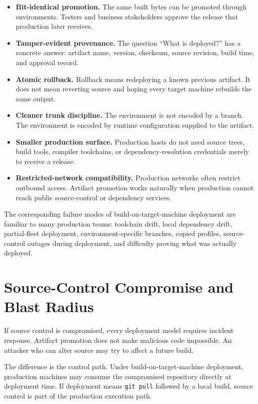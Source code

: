 \documentclass[11pt]{article}
\begin{document}
\begin{itemize}
\item \textbf{Bit-identical promotion.} The same built bytes can be promoted through environments. Testers and business stakeholders approve the release that production later receives.

\item \textbf{Tamper-evident provenance.} The question ``What is deployed?'' has a concrete answer: artifact name, version, checksum, source revision, build time, and approval record.

\item \textbf{Atomic rollback.} Rollback means redeploying a known previous artifact. It does not mean reverting source and hoping every target machine rebuilds the same output.

\item \textbf{Cleaner trunk discipline.} The environment is not encoded by a branch. The environment is encoded by runtime configuration supplied to the artifact.

\item \textbf{Smaller production surface.} Production hosts do not need source trees, build tools, compiler toolchains, or dependency-resolution credentials merely to receive a release.

\item \textbf{Restricted-network compatibility.} Production networks often restrict outbound access. Artifact promotion works naturally when production cannot reach public source-control or dependency services.
\end{itemize}

The corresponding failure modes of build-on-target-machine deployment are familiar to many production teams: toolchain drift, local dependency drift, partial-fleet deployment, environment-specific branches, copied profiles, source-control outages during deployment, and difficulty proving what was actually deployed.

\section{Source-Control Compromise and Blast Radius}

If source control is compromised, every deployment model requires incident response. Artifact promotion does not make malicious code impossible. An attacker who can alter source may try to affect a future build.

The difference is the control path. Under build-on-target-machine deployment, production machines may consume the compromised repository directly at deployment time. If deployment means \texttt{git pull} followed by a local build, source control is part of the production execution path.
\end{document}

